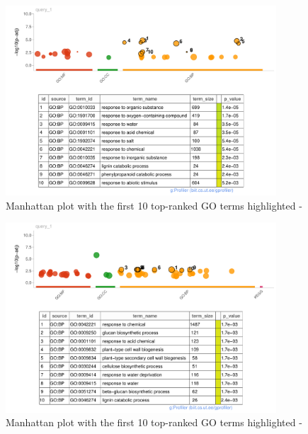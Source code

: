 \begin{figure}[htbp]
    \caption{Manhattan plot with the first 10 top-ranked GO terms highlighted - }
    \label{fig:5.2-Gost-Plot-Oryza_nivara}
    \includegraphics[width=0.9\textwidth]{../../results/plots-and-tables/5.2-Gost-Plot-Oryza_nivara}
\end{figure}

\begin{figure}[htbp]
    \caption{Manhattan plot with the first 10 top-ranked GO terms highlighted - }
    \label{fig:5.2-Gost-Plot-Oryza_sativa}
    \includegraphics[width=0.9\textwidth]{../../results/plots-and-tables/5.2-Gost-Plot-Oryza_sativa}
\end{figure}